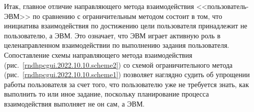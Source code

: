 	
Итак, главное отличие направляющего метода взаимодействия <<пользователь-ЭВМ>> по сравнению с ограничительным методом состоит в том, что инициатива взаимодействия по достижению цели пользователя принадлежит не пользователю, а ЭВМ. Это означает, что ЭВМ играет активную роль в целенаправленном взаимодействии по выполнению задания пользователя. Сопоставление схемы направляющего метода взаимодействия (рис.~\ref{rndhpcgui.2022.10.10.scheme2}) со схемой ограничительного метода (рис.~\ref{rndhpcgui.2022.10.10.scheme1}) позволяет наглядно судить об упрощении работы пользователя за счет того, что пользователю уже не требуется знать, как выполнить то или иное задание, поскольку планирование процесса взаимодействия выполняет не он сам, а ЭВМ.
\noteattributes{}

